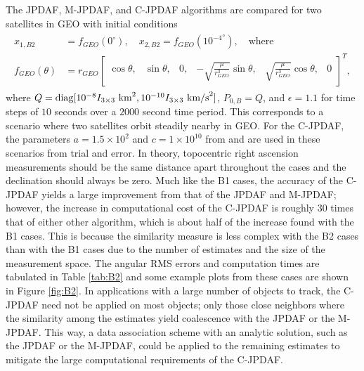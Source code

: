 The JPDAF, M-JPDAF, and C-JPDAF algorithms are compared for two satellites in GEO with initial conditions
\begin{align}
\begin{split}
x_{1,B2}&=f_{GEO}(0^\circ), \quad x_{2,B2}=f_{GEO}({10^{-4}}^\circ), \quad \mbox{where}
\\
f_{GEO}(\theta)&=r_{GEO}\begin{bmatrix}\cos\theta, & \sin\theta, & 0, & -\sqrt{\frac{\mu}{r_{GEO}^3}}\sin\theta, & \sqrt{\frac{\mu}{r_{GEO}^3}}\cos\theta, & 0\end{bmatrix}^T,
\end{split}
\end{align}
where $Q=\mathop{\mathrm{diag}}\nolimits[10^{-8}I_{3\times3}\ \text{km}^2, 10^{-10}I_{3\times3}\ \text{km/s}^2]$, $P_{0,B}=Q$, and $\epsilon=1.1$ for time steps of $10$ seconds over a $2000$ second time period.
This corresponds to a scenario where two satellites orbit steadily nearby in GEO.
For the C-JPDAF, the parameters $a=1.5\times10^{2}$ and $c=1\times10^{10}$ from  and  are used in these scenarios from trial and error.
In theory, topocentric right ascension measurements should be the same distance apart throughout the cases and the declination should always be zero.
Much like the B1 cases, the accuracy of the C-JPDAF yields a large improvement from that of the JPDAF and M-JPDAF; however, the increase in computational cost of the C-JPDAF is roughly $30$ times that of either other algorithm, which is about half of the increase found with the B1 cases.
This is because the similarity measure is less complex with the B2 cases than with the B1 cases due to the number of estimates and the size of the measurement space.
The angular RMS errors and computation times are tabulated in Table \ref{tab:B2} and some example plots from these cases are shown in Figure \ref{fig:B2}. In applications with a large number of objects to track, the C-JPDAF need not be applied on most objects; only those close neighbors where the similarity among the estimates yield coalescence with the JPDAF or the M-JPDAF. This way, a data association scheme with an analytic solution, such as the JPDAF or the M-JPDAF, could be applied to the remaining estimates to mitigate the large computational requirements of the C-JPDAF.





